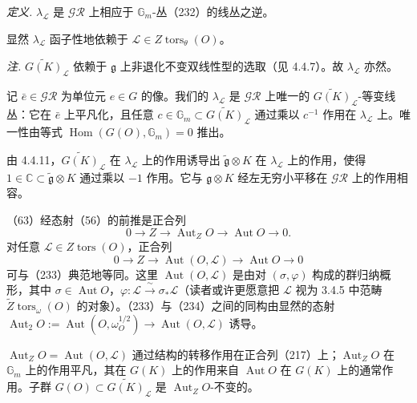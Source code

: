 
 \emph{定义.} $\lambda_{\mathcal{L}}$ 是 $\mathcal{GR}$ 上相应于 $\mathbb{G}_m$-丛（232）的线丛之逆。

显然 $\lambda_{\mathcal{L}}$ 函子性地依赖于 $\mathcal{L}\in Z\operatorname{tors}_\theta(O)$。

 \emph{注.} $\widetilde{G(K)}_{\mathcal{L}}$ 依赖于 $\mathfrak{g}$ 上非退化不变双线性型的选取（见 4.4.7）。故 $\lambda_{\mathcal{L}}$ 亦然。

 记 $\bar e\in\mathcal{GR}$ 为单位元 $e\in G$ 的像。我们的 $\lambda_{\mathcal{L}}$ 是 $\mathcal{GR}$ 上唯一的 $\widetilde{G(K)}_{\mathcal{L}}$-等变线丛：它在 $\bar e$ 上平凡化，且任意 $c\in\mathbb{G}_m\subset\widetilde{G(K)}_{\mathcal{L}}$ 通过乘以 $c^{-1}$ 作用在 $\lambda_{\mathcal{L}}$ 上。唯一性由等式 $\operatorname{Hom}(G(O),\mathbb{G}_m)=0$ 推出。

 由 4.4.11，$\widetilde{G(K)}_{\mathcal{L}}$ 在 $\lambda_{\mathcal{L}}$ 上的作用诱导出 $\widetilde{\mathfrak{g}}\otimes K$ 在 $\lambda_{\mathcal{L}}$ 上的作用，使得 $1\in\mathbb{C}\subset\widetilde{\mathfrak{g}}\otimes K$ 通过乘以 $-1$ 作用。它与 $\mathfrak{g}\otimes K$ 经左无穷小平移在 $\mathcal{GR}$ 上的作用相容。

 （63）经态射（56）的前推是正合列
\begin{equation}\tag{233}
0\to Z\to\operatorname{Aut}_Z O\to\operatorname{Aut}O\to0.
\end{equation}
对任意 $\mathcal{L}\in Z\operatorname{tors}(O)$，正合列
\begin{equation}\tag{234}
0\to Z\to\operatorname{Aut}(O,\mathcal{L})\to\operatorname{Aut}O\to0
\end{equation}
可与（233）典范地等同。这里 $\operatorname{Aut}(O,\mathcal{L})$ 是由对 $(\sigma,\varphi)$ 构成的群归纳概形，其中 $\sigma\in\operatorname{Aut}O$，$\varphi:\mathcal{L}\xrightarrow{\ \sim\ }\sigma_*\mathcal{L}$（读者或许更愿意把 $\mathcal{L}$ 视为 3.4.5 中范畴 $\widetilde{Z}\operatorname{tors}_\omega(O)$ 的对象）。（233）与（234）之间的同构由显然的态射 $\operatorname{Aut}_2 O:=\operatorname{Aut}(O,\omega_O^{1/2})\to\operatorname{Aut}(O,\mathcal{L})$ 诱导。

$\operatorname{Aut}_Z O=\operatorname{Aut}(O,\mathcal{L})$ 通过结构的转移作用在正合列（217）上；$\operatorname{Aut}_Z O$ 在 $\mathbb{G}_m$ 上的作用平凡，其在 $G(K)$ 上的作用来自 $\operatorname{Aut}O$ 在 $G(K)$ 上的通常作用。子群 $G(O)\subset\widetilde{G(K)}_{\mathcal{L}}$ 是 $\operatorname{Aut}_Z O$-不变的。


